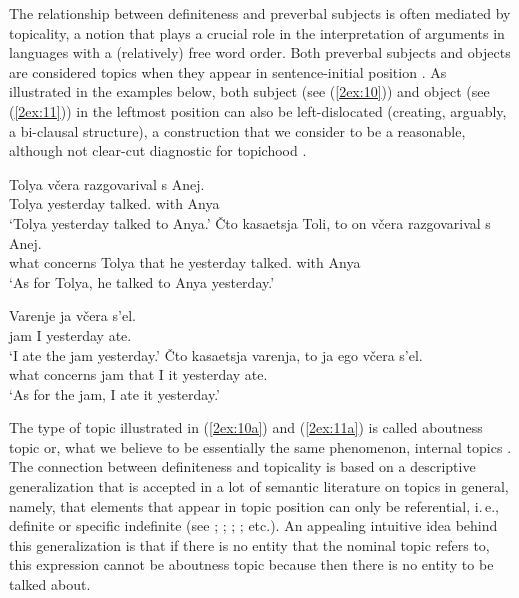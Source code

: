 \documentclass[output=paper]{langsci/langscibook}
\begin{document}
The relationship between definiteness and preverbal subjects is often mediated by topicality, a notion that plays a crucial role in the interpretation of arguments in languages with a (relatively) free word order. Both preverbal subjects and objects are considered topics when they appear in sentence-initial position \citep[][]{jasinskaja:14}. As illustrated in the examples below, both subject (see (\ref{2ex:10})) and object (see (\ref{2ex:11})) in the leftmost position can also be left-dislocated (creating, arguably, a bi-clausal structure), a construction that we consider to be a reasonable, although not clear-cut diagnostic for topichood \citep[][]{reinhart:81}.

\begin{exe}
\ex\label{2ex:10}
	\begin{xlista}
	\ex\label{2ex:10a}
	\gll	Tolya v\v{c}era 		razgovarival 	s 	Anej. \\
		Tolya yesterday 	talked.{} 	with	Anya 	\\
	\glt	`Tolya yesterday talked to Anya.'
	\ex\label{2ex:10b}
	\gll 	\v{C}to	kasaetsja	Toli, 		to 	on	v\v{c}era 	razgovarival 	s 	Anej. \\
		what 	concerns 	Tolya 	that	he	yesterday	talked.{} 	with	Anya \\
	\glt	`As for Tolya, he talked to Anya yesterday.'
	\end{xlista}
\ex\label{2ex:11}
	\begin{xlista}
	\ex\label{2ex:11a}
	\gll	Varenje	ja	v\v{c}era 	s'el. \\
		jam 		I 	yesterday 	ate.{\sc{pfv}} \\
	\glt	`I ate the jam yesterday.'
	\ex\label{2ex:11b}
	\gll	\v{C}to 	kasaetsja	varenja, 	to 	ja	ego 	v\v{c}era 	s'el. \\
		what 	concerns 	jam 		that 	I 	it 	yesterday 	ate.{\sc{pfv}} \\
	\glt	`As for the jam, I ate it yesterday.'
	\end{xlista}
\end{exe}

The type of topic illustrated in (\ref{2ex:10a}) and (\ref{2ex:11a}) is called aboutness topic \citep{reinhart:81} or, what we believe to be essentially the same phenomenon, internal topics \citep{king:95}. The connection between definiteness and topicality is based on a descriptive generalization that is accepted in a lot of semantic literature on topics in general, namely, that elements that appear in topic position can only be referential, i.\,e., definite or specific indefinite (see \citealt{reinhart:81}; \citealt{erteschik:shir:97}; \citealt{portner:yabushita:01}; \citealt{endriss:09}; etc.). An appealing intuitive idea behind this generalization is that if there is no entity that the nominal topic refers to, this expression cannot be aboutness topic because then there is no entity to be talked about.
\end{document}
